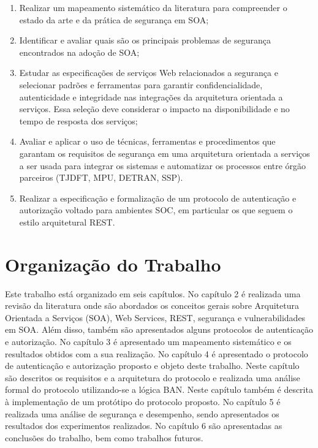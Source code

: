 \begin{enumerate}[a )]
	\item Realizar um mapeamento sistemático da literatura para compreender o estado da arte e da prática de segurança em SOA;

	\item Identificar e avaliar quais são os principais problemas de segurança encontrados na adoção de SOA;

	\item Estudar as especificações de serviços Web relacionados a segurança e selecionar padrões e ferramentas para garantir confidencialidade, autenticidade e integridade nas integrações da arquitetura orientada a serviços. Essa seleção deve considerar o impacto na disponibilidade e no tempo de resposta dos serviços;

    \item Avaliar e aplicar o uso de técnicas, ferramentas  e procedimentos que garantam os requisitos de segurança em uma arquitetura orientada a serviços a ser usada para integrar os sistemas e automatizar os processos entre órgão parceiros (TJDFT, MPU, DETRAN, SSP).
        

  \item Realizar a especifica\c c\~{a}o e formaliza\c c\~{a}o de um protocolo de autentica\c c\~{a}o e autoriza\c c\~{a}o  voltado para ambientes SOC, em particular os que seguem o estilo arquitetural REST.

\end{enumerate}

\section{Organização do Trabalho}

Este trabalho está organizado em seis capítulos.  No capítulo 2 é realizada uma revisão da literatura onde são abordados os conceitos gerais sobre Arquitetura Orientada a Serviços (SOA), Web Services, REST, segurança e vulnerabilidades em SOA. Além disso, também são apresentados alguns protocolos de autenticação e autorização. No capítulo 3 é  apresentado  um  mapeamento sistemático e os resultados obtidos com a sua realização. No capítulo 4 é apresentado o protocolo de autenticação e autorização proposto e objeto deste trabalho. Neste capítulo são descritos os requisitos e a arquitetura do protocolo e realizada uma análise formal do protocolo utilizando-se a lógica BAN. Neste capítulo também é descrita à implementação de um protótipo do protocolo proposto. No capítulo 5 é realizada uma análise de segurança e desempenho, sendo apresentados os resultados dos experimentos realizados. No capítulo 6 são apresentadas as conclusões do trabalho, bem como trabalhos futuros. 